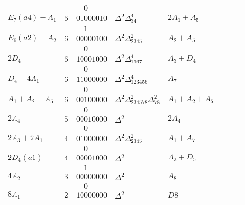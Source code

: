 \documentclass[10pt,leqno]{article}
\begin{document}
\begin{tabular}{|l|l|l|l|l|l|l|l|}
        &      &          $\phantom{11}0$&&\\
$E_7(a4)+A_1$ & $6$  &$01000010$ & $\Delta^2\Delta_{34}^{4}$ & $2A_1+A_5$ \\\hline
        &      &          $\phantom{11}1$&&\\
$E_6(a2)+A_2$ & $6$  &$00000100$ & $\Delta^2\Delta_{2345}^{2}$ & $A_2+A_5$ \\\hline
        &      &          $\phantom{11}0$&&\\
$2D_4$ & $6$  &$10001000$ & $\Delta^2\Delta_{1367}^{4}$ & $A_3+D_4$ \\\hline
        &      &          $\phantom{11}0$&&\\
$D_4+4A_1$ & $6$  &$11000000$ & $\Delta^2\Delta_{123456}^{4}$ & $A_7$ \\\hline
        &      &          $\phantom{11}0$&&\\
$A_1+A_2+A_5$ & $6$  &$00100000$ & $\Delta^2\Delta_{234578}^{2}\Delta_{78}^{2}$ & $A_1+A_2+A_5$ \\\hline
        &      &          $\phantom{11}0$&&\\
$2A_4$ & $5$  &$00010000$ & $\Delta^2$ & $2A_4$ \\\hline
        &      &          $\phantom{11}0$&&\\
$2A_3+2A_1$ &  $4$ &$01000000$ & $\Delta^2\Delta_{2345}^{2}$ & $A_1+A_7$ \\\hline
        &      &          $\phantom{11}0$&&\\
$2D_4(a1)$ & $4$  & $00001000$ & $\Delta^2$ & $A_3+D_5$ \\\hline
        &      &          $\phantom{11}1$&&\\
$4A_2$ & $3$  &$00000000$ & $\Delta^2$ & $A_8$ \\\hline
        &      &          $\phantom{11}0$&&\\  
  $8A_1$ & $2$ &$10000000$ & $\Delta^2$ & $D8$ \\\hline
                                          
\end{tabular}
\end{document}
